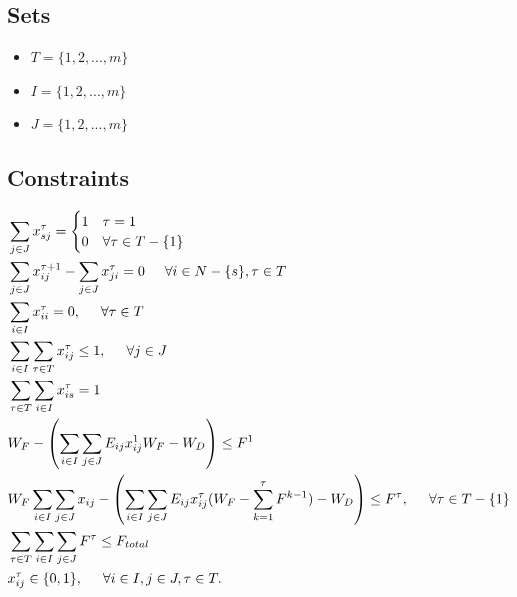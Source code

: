\subsection*{Sets}
\begin{itemize}
    \item $T = \{1,2,...,m\}$
    \item $I = \{1,2,...,m\}$
    \item $J = \{1,2,...,m\}$
\end{itemize}
\subsection*{Constraints}
\begin{align}
&\sum_{j\in J} x_{sj}^{\tau} = \begin{cases} 
1 & \tau = 1\\
0 & \forall\tau\in T-\{1\} \end{cases} \label{cons:comefromsource}\\
&\sum_{j\in J} x_{ij}^{\tau+1}-\sum_{j\in J}x^{\tau}_{ji} = 0 \hspace{0.5cm} \forall i\in N-\{s\},\tau \in T \label{cons:outtoin}\\
&\sum_{i\in I}x_{ii}^{\tau} = 0, \hspace{0.5cm} \forall \tau \in T \label{cons:self}\\
&\sum_{i\in I}\sum_{\tau\in T} x_{ij}^\tau\leq 1, \hspace{0.5cm} \forall j \in J\label{cons:do not revisit}\\
&\sum_{\tau\in T}\sum_{i\in I} x_{is}^\tau = 1\label{cons:return}\\
&W_F-\left(\sum_{i\in I}\sum_{j\in J}E_{ij}x_{ij}^1W_F - W_D\right) \leq F^{1} \label{cons:fuelstart}\\
&W_F\sum_{i\in I}\sum_{j\in J}x_{ij}-\left(\sum_{i\in I}\sum_{j\in J}E_{ij}x_{ij}^{\tau}(W_F-\sum_{k = 1}^{\tau}F^{k-1}) - W_D\right) \leq F^{\tau}, \hspace{.5cm} \forall \tau \in T-\{1\}\label{cons:fuelnext}\\
&\sum_{\tau\in T}\sum_{i\in I}\sum_{j\in J} F^{\tau} \leq F_{total}\label{cons:fueltotal}\\
&x_{ij}^{\tau}\in \{0,1\}, \hspace{0.5cm} \forall i\in I,j\in J,\tau\in T\label{cons:binary}.
\end{align}
